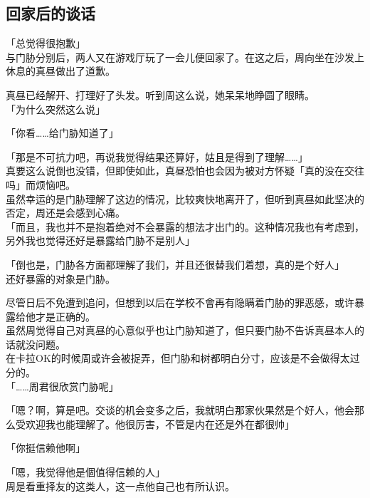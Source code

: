 \subsection{回家后的谈话}

「总觉得很抱歉」\\

与门胁分别后，两人又在游戏厅玩了一会儿便回家了。在这之后，周向坐在沙发上休息的真昼做出了道歉。

真昼已经解开、打理好了头发。听到周这么说，她呆呆地睁圆了眼睛。\\

「为什么突然这么说」

「你看……给门胁知道了」

「那是不可抗力吧，再说我觉得结果还算好，姑且是得到了理解……」\\

真要这么说倒也没错，但即使如此，真昼恐怕也会因为被对方怀疑「真的没在交往吗」而烦恼吧。\\

虽然幸运的是门胁理解了这边的情况，比较爽快地离开了，但听到真昼如此坚决的否定，周还是会感到心痛。\\

「而且，我也并不是抱着绝对不会暴露的想法才出门的。这种情况我也有考虑到，另外我也觉得还好是暴露给门胁不是别人」

「倒也是，门胁各方面都理解了我们，并且还很替我们着想，真的是个好人」\\

还好暴露的对象是门胁。

尽管日后不免遭到追问，但想到以后在学校不會再有隐瞒着门胁的罪恶感，或许暴露给他才是正确的。\\

虽然周觉得自己对真昼的心意似乎也让门胁知道了，但只要门胁不告诉真昼本人的话就没问题。\\

在卡拉OK的时候周或许会被捉弄，但门胁和树都明白分寸，应该是不会做得太过分的。\\

「……周君很欣赏门胁呢」

「嗯？啊，算是吧。交谈的机会变多之后，我就明白那家伙果然是个好人，他会那么受欢迎我也能理解了。他很厉害，不管是内在还是外在都很帅」

「你挺信赖他啊」

「嗯，我觉得他是個值得信赖的人」\\

周是看重择友的这类人，这一点他自己也有所认识。\\

